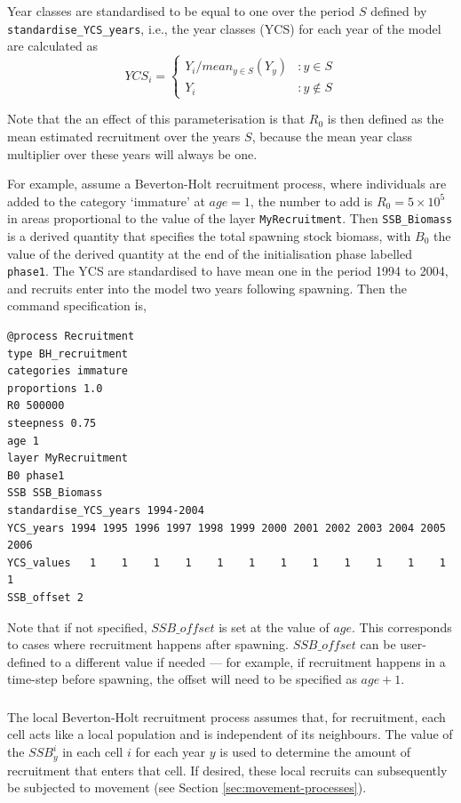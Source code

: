 Year classes are standardised to be equal to one over the period $S$ defined by \texttt{standardise\_YCS\_years}, i.e., the year classes (YCS) for each year of the model are calculated as 
\begin{equation}
  YCS_i = \left\{
	   \begin{array}{ll}
     Y_i / mean_{y \in S}(Y_y) & : y \in S \\
	   Y_i & : y \notin S
  \end{array}
  \right.
\end{equation}

Note that the an effect of this parameterisation is that $R_0$ is then defined as the mean estimated recruitment over the years $S$, because the mean year class multiplier over these years will always be one.

For example, assume a Beverton-Holt recruitment process, where individuals are added to the category `immature' at $age=1$, the number to add is $R_0=5 \times 10^5$ in areas proportional to the value of the layer \texttt{MyRecruitment}. Then \texttt{SSB\_Biomass} is a derived quantity that specifies the total spawning stock biomass, with $B_0$ the value of the derived quantity at the end of the initialisation phase labelled \texttt{phase1}. The YCS are standardised to have mean one in the period 1994 to 2004, and recruits enter into the model two years following spawning. Then the command specification is,
{\small{\begin{verbatim}
@process Recruitment
type BH_recruitment
categories immature
proportions 1.0
R0 500000
steepness 0.75
age 1
layer MyRecruitment
B0 phase1
SSB SSB_Biomass
standardise_YCS_years 1994-2004
YCS_years 1994 1995 1996 1997 1998 1999 2000 2001 2002 2003 2004 2005 2006
YCS_values   1    1    1    1    1    1    1    1    1    1    1    1    1
SSB_offset 2
\end{verbatim}}}

Note that if not specified, $SSB\_offset$ is set at the value of $age$. This corresponds to cases where recruitment happens after spawning. $SSB\_offset$ can be user-defined to a different value if needed --- for example, if recruitment happens in a time-step before spawning, the offset will need to be specified as $age + 1$.

\subsubsection*{}

The local Beverton-Holt recruitment process assumes that, for recruitment, each cell acts like a local population and is independent of its neighbours. The value of the $SSB_y^i$ in each cell $i$ for each year $y$ is used to determine the amount of recruitment that enters that cell. If desired, these local recruits can subsequently be subjected to movement (see Section \ref{sec:movement-processes}).

